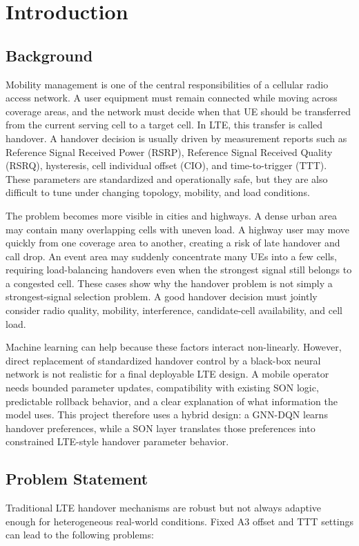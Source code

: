 \documentclass[12pt,a4paper]{report}
\begin{document}
\tableofcontents
\listoffigures
\listoftables
\clearpage
{}

\chapter{Introduction}

\section{Background}
Mobility management is one of the central responsibilities of a cellular radio access network. A user equipment must remain connected while moving across coverage areas, and the network must decide when that UE should be transferred from the current serving cell to a target cell. In LTE, this transfer is called handover. A handover decision is usually driven by measurement reports such as Reference Signal Received Power (RSRP), Reference Signal Received Quality (RSRQ), hysteresis, cell individual offset (CIO), and time-to-trigger (TTT). These parameters are standardized and operationally safe, but they are also difficult to tune under changing topology, mobility, and load conditions.

The problem becomes more visible in cities and highways. A dense urban area may contain many overlapping cells with uneven load. A highway user may move quickly from one coverage area to another, creating a risk of late handover and call drop. An event area may suddenly concentrate many UEs into a few cells, requiring load-balancing handovers even when the strongest signal still belongs to a congested cell. These cases show why the handover problem is not simply a strongest-signal selection problem. A good handover decision must jointly consider radio quality, mobility, interference, candidate-cell availability, and cell load.

Machine learning can help because these factors interact non-linearly. However, direct replacement of standardized handover control by a black-box neural network is not realistic for a final deployable LTE design. A mobile operator needs bounded parameter updates, compatibility with existing SON logic, predictable rollback behavior, and a clear explanation of what information the model uses. This project therefore uses a hybrid design: a GNN-DQN learns handover preferences, while a SON layer translates those preferences into constrained LTE-style handover parameter behavior.

\section{Problem Statement}
Traditional LTE handover mechanisms are robust but not always adaptive enough for heterogeneous real-world conditions. Fixed A3 offset and TTT settings can lead to the following problems:
\end{document}
